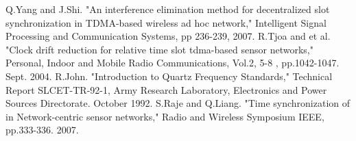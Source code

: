 \documentclass[journal]{IEEEtran}
\begin{document}
\begin{thebibliography}{\textbf{References}}
Q.Yang and J.Shi. "An interference elimination method for decentralized slot synchronization in TDMA-based wireless ad hoc network," Intelligent Signal Processing and Communication Systems, pp 236-239, 2007.
R.Tjoa and et al. "Clock drift reduction for relative time slot tdma-based sensor networks," Personal, Indoor and Mobile Radio Communications, Vol.2, 5-8 , pp.1042-1047. Sept. 2004.
R.John. "Introduction to Quartz Frequency Standards," Technical Report SLCET-TR-92-1, Army Research Laboratory, Electronics and Power Sources Directorate. October 1992.
S.Raje and Q.Liang. "Time synchronization of in Network-centric sensor networks," Radio and Wireless Symposium IEEE, pp.333-336. 2007.
\end{thebibliography}
\end{document}
